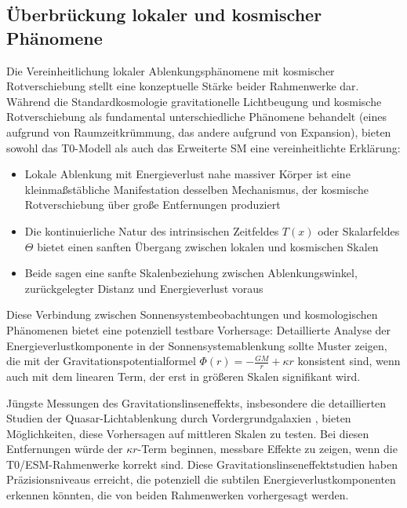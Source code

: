 \documentclass[12pt,a4paper]{article}
\newcommand{\Tfield}{T(x)}
\begin{document}
	\subsection{Überbrückung lokaler und kosmischer Phänomene}
	\label{subsec:bridging_phenomena}
	
	Die Vereinheitlichung lokaler Ablenkungsphänomene mit kosmischer Rotverschiebung stellt eine konzeptuelle Stärke beider Rahmenwerke dar. Während die Standardkosmologie gravitationelle Lichtbeugung und kosmische Rotverschiebung als fundamental unterschiedliche Phänomene behandelt (eines aufgrund von Raumzeitkrümmung, das andere aufgrund von Expansion), bieten sowohl das T0-Modell als auch das Erweiterte SM eine vereinheitlichte Erklärung:
	
	\begin{itemize}
		\item Lokale Ablenkung mit Energieverlust nahe massiver Körper ist eine kleinmaßstäbliche Manifestation desselben Mechanismus, der kosmische Rotverschiebung über große Entfernungen produziert
		\item Die kontinuierliche Natur des intrinsischen Zeitfeldes \(\Tfield\) oder Skalarfeldes \(\Theta\) bietet einen sanften Übergang zwischen lokalen und kosmischen Skalen
		\item Beide sagen eine sanfte Skalenbeziehung zwischen Ablenkungswinkel, zurückgelegter Distanz und Energieverlust voraus
	\end{itemize}
	
	Diese Verbindung zwischen Sonnensystembeobachtungen und kosmologischen Phänomenen bietet eine potenziell testbare Vorhersage: Detaillierte Analyse der Energieverlustkomponente in der Sonnensystemablenkung sollte Muster zeigen, die mit der Gravitationspotentialformel \(\Phi(r) = -\frac{GM}{r} + \kappa r\) konsistent sind, wenn auch mit dem linearen Term, der erst in größeren Skalen signifikant wird.
	
	Jüngste Messungen des Gravitationslinseneffekts, insbesondere die detaillierten Studien der Quasar-Lichtablenkung durch Vordergrundgalaxien \cite{Bolton2008, Suyu2017}, bieten Möglichkeiten, diese Vorhersagen auf mittleren Skalen zu testen. Bei diesen Entfernungen würde der \(\kappa r\)-Term beginnen, messbare Effekte zu zeigen, wenn die T0/ESM-Rahmenwerke korrekt sind. Diese Gravitationslinseneffektstudien haben Präzisionsniveaus erreicht, die potenziell die subtilen Energieverlustkomponenten erkennen könnten, die von beiden Rahmenwerken vorhergesagt werden.
	
\end{document}
